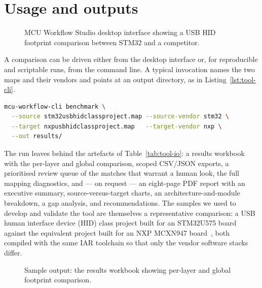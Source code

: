 \section{Usage and outputs}
\label{sec:tool-usage}

\begin{figure}[H]
\centering
{}
\caption{MCU Workflow Studio desktop interface showing a USB HID footprint comparison between STM32 and a competitor.}
\label{fig:tool-gui}
\end{figure}

A comparison can be driven either from the desktop interface or, for reproducible and scriptable
runs, from the command line. A typical invocation names the two maps and their vendors and points
at an output directory, as in Listing~\ref{lst:tool-cli}.

\lstset{style=mystyle}
\begin{lstlisting}[language=bash, caption={Command-line invocation of a footprint benchmark.}, label={lst:tool-cli}]
mcu-workflow-cli benchmark \
  --source stm32usbhidclassproject.map --source-vendor stm32 \
  --target nxpusbhidclassproject.map   --target-vendor nxp \
  --out results/
\end{lstlisting}

The run leaves behind the artefacts of Table~\ref{tab:tool-io}: a results workbook with the
per-layer and global comparison, scoped CSV/JSON exports, a prioritised review queue of the
matches that warrant a human look, the full mapping diagnostics, and --- on request --- an
eight-page PDF report with an executive summary, source-versus-target charts, an
architecture-and-module breakdown, a gap analysis, and recommendations. The samples we used to
develop and validate the tool are themselves a representative comparison: a USB human interface device (HID)
class project built for an STM32U575 board against the equivalent project built for an NXP
MCXN947 board~\cite{nxp-mcuxpresso}, both compiled with the same IAR toolchain so that only the
vendor software stacks differ.

\begin{figure}[H]
\centering
{}
\caption{Sample output: the results workbook showing per-layer and global footprint comparison.}
\label{fig:tool-results-xlsx}
\end{figure}

